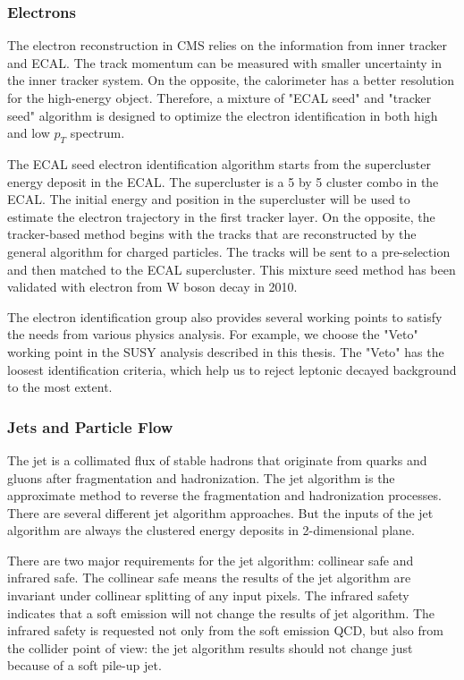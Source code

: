 \subsubsection{Electrons}
The electron reconstruction in CMS relies on the information from inner tracker and ECAL. The track momentum can be measured with smaller uncertainty in the inner tracker system. On the opposite, the calorimeter has a better resolution for the high-energy object. Therefore, a mixture of "ECAL seed" and "tracker seed" algorithm is designed to optimize the electron identification in both high and low $p_{T}$ spectrum. 

The ECAL seed electron identification algorithm starts from the supercluster energy deposit in the ECAL. The supercluster is a 5 by 5 cluster combo in the ECAL. The initial energy and position in the supercluster will be used to estimate the electron trajectory in the first tracker layer. On the opposite, the tracker-based method begins with the tracks that are reconstructed by the general algorithm for charged particles. The tracks will be sent to a pre-selection and then matched to the ECAL supercluster. This mixture seed method has been validated with electron from W boson decay in 2010\cite{Khachatryan:2015hwa}. 

The electron identification group also provides several working points to satisfy the needs from various physics analysis. For example, we choose the "Veto" working point in the SUSY analysis described in this thesis. The "Veto" has the loosest identification criteria, which help us to reject leptonic decayed background to the most extent. 

\subsubsection{Jets and Particle Flow}

The jet is a collimated flux of stable hadrons that originate from quarks and gluons after fragmentation and hadronization. The jet algorithm is the approximate method to reverse the fragmentation and hadronization processes.  There are several different jet algorithm approaches. But the inputs of the jet algorithm are always the clustered energy deposits in 2-dimensional plane. 

There are two major requirements for the jet algorithm: collinear safe and infrared safe. The collinear safe means the results of the jet algorithm are invariant under collinear splitting of any input pixels. The infrared safety indicates that a soft emission will not change the results of jet algorithm. The infrared safety is requested not only from the soft emission QCD, but also from the collider point of view: the jet algorithm results should not change just because of a soft pile-up jet. 

